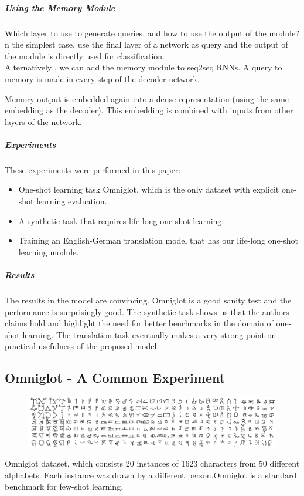 \subparagraph{Using the Memory Module}
Which layer to use to generate queries, and how to use the output of the module? n the simplest case, use the final layer of a network as query and the output of the module is directly used for classification.\\ 

Alternatively , we can add the memory module to seq2seq RNNs. A query to memory is made in every step of the decoder network.\newline

Memory output is embedded again into a dense representation (using the same embedding as the decoder). This embedding is combined with inputs from other layers of the network.

\subparagraph{Experiments}
These experiments were performed in this paper:
\begin{itemize}
\setlength\itemsep{0.05em}
\item  One-shot learning task Omniglot, which is the only dataset with explicit one-shot learning evaluation.
\item A synthetic task that requires life-long one-shot learning.
\item Training an English-German translation model that has our life-long one-shot learning module. 
\end{itemize}

\subparagraph{Results}
The results in the model are convincing. Omniglot is a good sanity test and the performance is surprisingly good.\newline
The synthetic task shows us that the authors claims hold and highlight the need for better benchmarks in the domain of one-shot learning.\newline
The translation task eventually makes a very strong point on practical usefulness of the proposed model.

\pagebreak

\subsection{Omniglot - A Common Experiment}
\begin{figure}[h]
\includegraphics[width=\textwidth,keepaspectratio]{omniglot.png}
\end{figure}
Omniglot dataset\cite{Lake_oneshot}, which consists 20 instances of 1623 characters from 50 different alphabets. Each instance was drawn by a different person.Omniglot is a standard benchmark for few-shot learning. \newline

